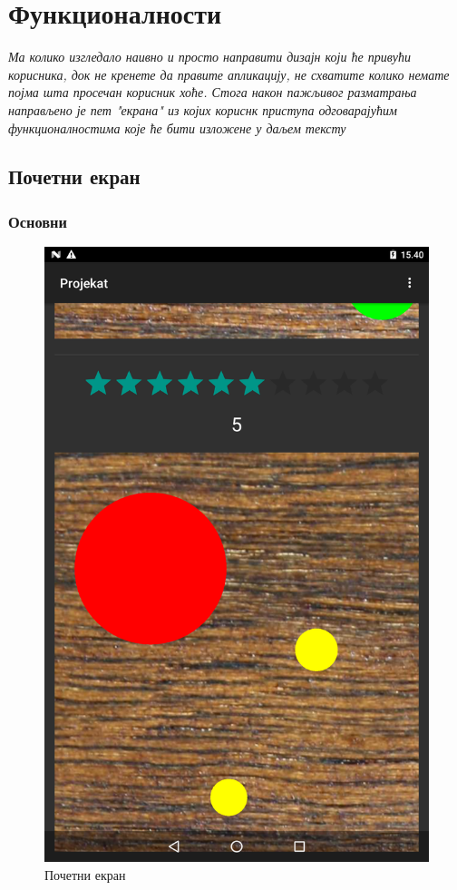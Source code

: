 \chapter{Функционалности} \label{UseCases}
\emph{Ма колико изгледало наивно и просто направити дизајн који ће привући корисника, док не кренете да правите апликацију, не схватите колико немате појма шта просечан корисник хоће. Стога након пажљивог разматрања направљено је пет "екрана" из којих кориснк приступа одговарајућим функционалностима које ће бити изложене у даљем тексту}

\section{Почетни екран} \label{UseCases:Main}

\subsection{Основни}
\begin{figure}[htb!]
\begin{center}
\includegraphics[scale=.1]{pictures/main/Basic}
\caption{Почетни екран}\label{fig:mainBasic}
\end{center}
\end{figure}
